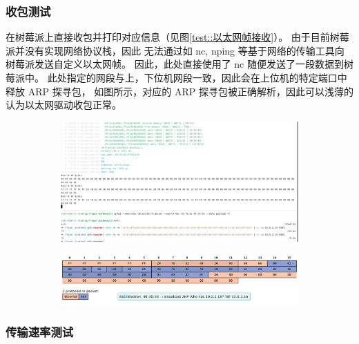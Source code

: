     \subsubsection{收包测试}

    在树莓派上直接收包并打印对应信息（见图\ref{test::以太网帧接收}）。
    由于目前树莓派并没有实现网络协议栈，因此
    无法通过如 nc, nping 等基于网络的传输工具向树莓派发送自定义以太网帧。
    因此，此处直接使用了 nc 随便发送了一段数据到树莓派中。
    此处指定的网段与上，下位机网段一致，因此会在上位机的特定端口中释放 ARP 探寻包，
    如图所示，对应的 ARP 探寻包被正确解析，因此可以浅薄的认为以太网驱动收包正常。

    \begin{figure}[ht]
        \centering
        \caption{接受的以太网帧及解析} \label{test::以太网帧接收}
        \begin{subfigure}
            \centering
            \includegraphics[width=\textwidth]{./imgs/测试-以太网帧接收.png}
        \end{subfigure}
        \hfill
        \begin{subfigure}
            \centering
            \includegraphics[width=\textwidth]{./imgs/测试-以太网帧接收-解析.png}
        \end{subfigure}
    \end{figure}

    \subsubsection{传输速率测试}


